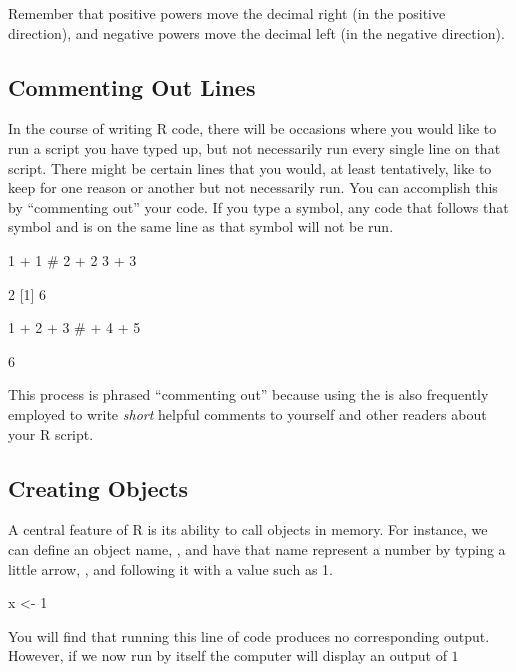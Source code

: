 Remember that positive powers move the decimal right (in the positive direction), and negative powers move the decimal left (in the negative direction).


\subsection{Commenting Out Lines}
In the course of writing R code, there will be occasions where you would like to run a script you have typed up, but not necessarily run every single line on that script.  There might be certain lines that you would, at least tentatively, like to keep for one reason or another but not necessarily run.  You can accomplish this by ``commenting out'' your code.  If you type a \R{\#} symbol, any code that follows that symbol and is on the same line as that symbol will not be run.

\begin{inR}
1 + 1
# 2 + 2
3 + 3
\end{inR}
\begin{outR}
[1] 2
[1] 6
\end{outR}

\begin{inR}
1 + 2 + 3 # + 4 + 5
\end{inR}
\begin{outR}
[1] 6
\end{outR}

\noindent
This process is phrased ``commenting out'' because using the \R{\#} is also frequently employed to write \textit{short} helpful comments to yourself and other readers about your R script.


\subsection{Creating Objects}

A central feature of R is its ability to call objects in memory. For instance, we can define an object name, , and have that name represent a number by typing a little arrow, \R{<-}, and following it with a value such as 1.

\begin{inR}
x <- 1
\end{inR}

\vspace{1em}

You will find that running this line of code produces no corresponding output.  However, if we now run  by itself the computer will display an output of $1$

